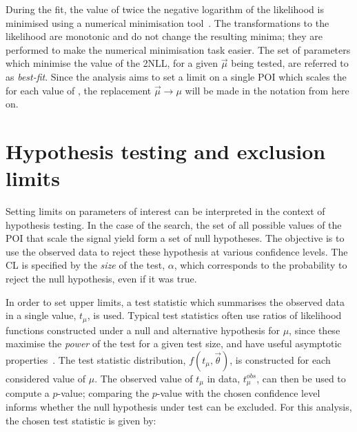 During the fit, the value of twice the negative logarithm of the likelihood is minimised using a numerical minimisation tool~\cite{RooFit}. The transformations to the likelihood are monotonic and do not change the resulting minima; they are performed to make the numerical minimisation task easier. The set of parameters which minimise the value of the 2NLL, for a given $\vec{\mu}$ being tested, are referred to as \textit{best-fit}. 
Since the \Hee analysis aims to set a limit on a single POI which scales the \BHee for each value of \mH, the replacement $\vec{\mu}\rightarrow\mu$ will be made in the notation from here on.



\section{Hypothesis testing and exclusion limits}
Setting limits on parameters of interest can be interpreted in the context of hypothesis testing. In the case of the \Hee search, the set of all possible values of the POI that scale the signal yield form a set of null hypotheses. The objective is to use the observed data to reject these hypothesis at various confidence levels. The CL is specified by the \textit{size} of the test, $\alpha$, which corresponds to the probability to reject the null hypothesis, even if it was true. 

In order to set upper limits, a test statistic which summarises the observed data in a single value, $t_{\mu}$, is used. Typical test statistics often use ratios of likelihood functions constructed under a null and alternative hypothesis for $\mu$, since these maximise the \textit{power} of the test for a given test size, and have useful asymptotic properties~\cite{NeymanPearson}. The test statistic distribution, $f(t_{\mu},\vec{\theta})$, is constructed for each considered value of $\mu$. The observed value of $t_{\mu}$ in data, $t_{\mu}^{obs}$, can then be used to compute a $p$-value; comparing the $p$-value with the chosen confidence level informs whether the null hypothesis under test can be excluded. For this analysis, the chosen test statistic is given by:

